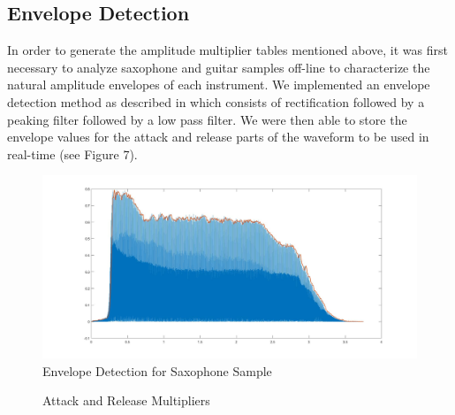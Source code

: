 \documentclass[12pt]{article}
\begin{document}
\subsection{Envelope Detection}
In order to generate the amplitude multiplier tables mentioned above, it was first necessary to analyze saxophone and guitar samples off-line to characterize the natural amplitude envelopes of each instrument. We implemented an envelope detection method as described in \cite{DBLP:journals/corr/Jarne17} which consists of rectification followed by a peaking filter followed by a low pass filter. We were then able to store the envelope values for the attack and release parts of the waveform to be used in real-time (see Figure 7).

\begin{figure}[h]
\includegraphics[scale=0.2]{Pictures/EnvDetection.jpg}
\centering
\caption{Envelope Detection for Saxophone Sample}
\centering
\end{figure}
\setlength{\abovecaptionskip}{-20pt}
\begin{figure}[h]
\caption{Attack and Release Multipliers}
\end{figure}
\end{document}
